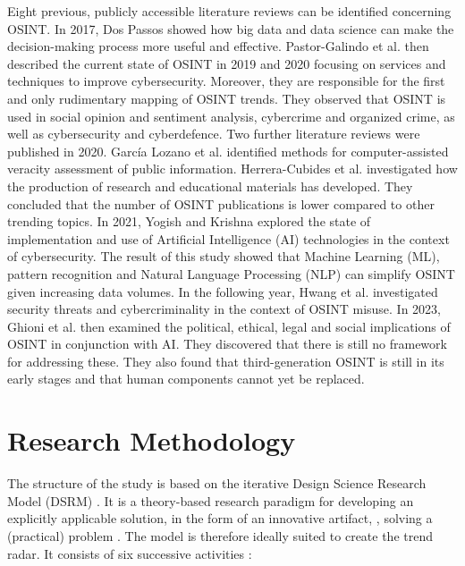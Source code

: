 \documentclass[10pt]{article}
\begin{document}
Eight previous, publicly accessible literature reviews can be identified
concerning OSINT. In 2017, Dos Passos \cite{DosPassos.2017} showed how big data and data science can
make the decision-making process more useful and effective. Pastor-Galindo et al. then described
the current state of OSINT in 2019 \cite{PastorGalindo.2019} and 2020 \cite{PastorGalindo.2020}
focusing on services and techniques to improve cybersecurity. Moreover, they are responsible
for the first and only rudimentary mapping of OSINT trends. They observed that OSINT is used in
social opinion and sentiment analysis, cybercrime and organized crime, as well as cybersecurity and cyberdefence.
Two further literature reviews were published in 2020. García Lozano et al. \cite{GarciaLozano.2020} identified
methods for computer-assisted veracity assessment of public information.
Herrera-Cubides et al. \cite{HerreraCubides.2020} investigated how the production of
research and educational materials has developed. They concluded that
the number of OSINT publications is lower compared to other trending topics. In 2021,
Yogish and Krishna \cite{Yogish.2021} explored the state of implementation and use of
Artificial Intelligence (AI) technologies in the context of cybersecurity. The result of this
study showed that Machine Learning (ML), pattern recognition and Natural Language Processing
(NLP) can simplify OSINT given increasing data volumes. In the following year, Hwang et al.
\cite{Hwang.2022} investigated security threats and cybercriminality in the context of OSINT misuse.
In 2023, Ghioni et al. \cite{Ghioni.2023} then examined the political, ethical, legal and social implications of
OSINT in conjunction with AI. They discovered that there is still no framework
for addressing these. They also found that third-generation OSINT is still in its early
stages and that human components cannot yet be replaced.


\section{Research Methodology}

The structure of the study is based on the iterative Design Science Research Model (DSRM) \cite{Peffers.2007}. It is a theory-based
research paradigm for developing an explicitly applicable solution, in the form of an innovative artifact,
\cite{vomBrocke.2020b}, solving a (practical) problem \cite{Peffers.2007,Hevner.2004}. The model is therefore ideally suited to
create the trend radar. It consists of six successive activities \cite{Peffers.2007}:
\end{document}
